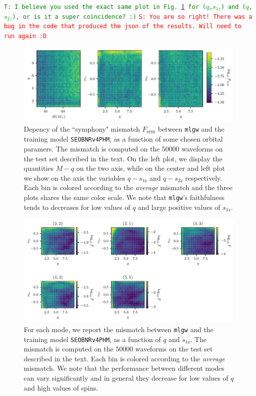 \documentclass[twocolumn,showpacs,preprintnumbers,nofootinbib,prd,
superscriptaddress,10pt]{revtex4-1}
\newcommand{\stefano}[1]{{\textcolor{red}{\texttt{S: #1}} }}
\newcommand{\tim}[1]{{\textcolor{green}{\texttt{T: #1}} }}
\begin{document}
\tim{I believe you used the exact same plot in Fig.~\ref{fig:countour_plots} for ($q$,$s_{1z}$) and ($q$,$s_{2z}$), or is it a super coincidence? :)}
\stefano{You are so right! There was a bug in the code that produced the json of the results. Will need to run again :D}
\begin{figure}[t]
	\centering
	\includegraphics[width=\textwidth]{colormesh}
	\caption{
	Depency of the ``symphony" mismatch $F_\text{sym}$ between \texttt{mlgw} and the training model \texttt{SEOBNRv4PHM}, as a function of some chosen orbital paramers. The mismatch is computed on the $50000$ waveforms on the test set described in the text.
	On the left plot, we display the quantities $M-q$ on the two axis, while on the center and left plot we show on the axis the variables $q-s_\text{1z}$ and $q-s_\text{2z}$ respectively. 
	Each bin is colored according to the \textit{average} mismatch and the three plots shares the same color scale.
	We note that \texttt{mlgw}'s faithfulness tends to decreases for low values of $q$ and large positive values of $s_\text{1z}$.
	}
	\label{fig:countour_plots}
\end{figure}

\begin{figure}[t]
	\centering
	\includegraphics[width=\textwidth]{colormesh_modes}
	\caption{
	For each mode, we report the mismatch between \texttt{mlgw} and the training model \texttt{SEOBNRv4PHM}, as a function of $q$ and $s_\text{1z}$. The mismatch is computed on the $50000$ waveforms on the test set described in the text.
	Each bin is colored according to the \textit{average} mismatch.
	We note that the performance between different modes can vary significantly and in general they decrease for low values of $q$ and high values of spins.
	}
	\label{fig:countour_plots_modes}
\end{figure}
\end{document}
